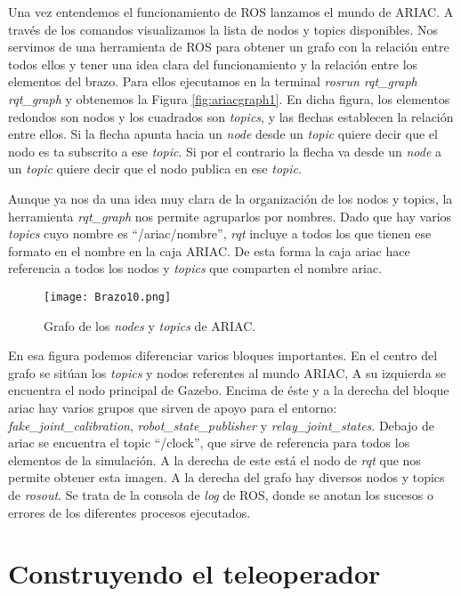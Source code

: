 Una vez entendemos el funcionamiento de ROS lanzamos el mundo de ARIAC. A través de los comandos visualizamos la lista de nodos y topics disponibles. Nos servimos de una herramienta de ROS para obtener un grafo con la relación entre todos ellos y tener una idea clara del funcionamiento y la relación entre los elementos del brazo. Para ellos ejecutamos en la terminal \textit{rosrun rqt\_graph rqt\_graph} y obtenemos la Figura \ref{fig:ariacgraph1}. En dicha figura, los elementos redondos son nodos y los cuadrados son \textit{topics}, y las flechas establecen la relación entre ellos. Si la flecha apunta hacia un \textit{node} desde un \textit{topic} quiere decir que el nodo es ta subscrito a ese \textit{topic}. Si por el contrario la flecha va desde un \textit{node} a un \textit{topic} quiere decir que el nodo publica en ese \textit{topic}.

Aunque ya nos da una idea muy clara de la organización de los nodos y topics, la herramienta \textit{rqt\_graph} nos permite agruparlos por nombres. Dado que hay varios \textit{topics} cuyo nombre es \textquotedblleft /ariac/nombre\textquotedblright , \textit{rqt} incluye a todos los que tienen ese formato en el nombre en la caja ARIAC. De esta forma la caja ariac hace referencia a todos los nodos y \textit{topics} que comparten el nombre ariac.

\begin{figure}[h]
	\centering\texttt{[image: Brazo10.png]}
	\caption{Grafo de los \textit{nodes} y \textit{topics} de ARIAC.}
	\label{fig:ariacgraph2}
\end{figure}

En esa figura podemos diferenciar varios bloques importantes. En el centro del grafo se sitúan los \textit{topics} y nodos referentes al mundo ARIAC, A su izquierda se encuentra el nodo principal de Gazebo. Encima de éste y a la derecha del bloque ariac hay varios grupos que sirven de apoyo para el entorno: \textit{fake\_joint\_calibration}, \textit{robot\_state\_publisher} y \textit{relay\_joint\_states}.
Debajo de ariac se encuentra el topic \textquotedblleft /clock\textquotedblright  , que sirve de referencia para todos los elementos de la simulación. A la derecha de este está el nodo de \textit{rqt} que nos permite obtener esta imagen. A la derecha del grafo hay diversos nodos y topics de \textit{rosout}. Se trata de la consola de \textit{log} de ROS, donde se anotan los sucesos o errores de los diferentes procesos ejecutados.

\section{Construyendo el teleoperador}
\label{sec:br_construyendo teleoperador}

